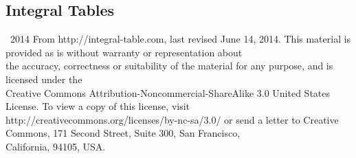 \documentclass[11pt, letterpaper, notitlepage]{article}
\begin{document}
\subsection{Integral Tables}
{\tiny \rmfamily {} \selectfont
\textcopyleft\ 2014 From http://integral-table.com, last revised June 14, 2014. This material is provided as is without warranty or representation about \\ the accuracy, correctness or suitability of the material for any purpose, and is licensed under the \\ Creative Commons Attribution-Noncommercial-ShareAlike 3.0 United States License. To view a copy of this license, visit \\ http://creativecommons.org/licenses/by-nc-sa/3.0/ or send a letter to Creative Commons, 171 Second Street, Suite 300, San Francisco, \\ California, 94105, USA.
}
\normalsize
\end{document}
